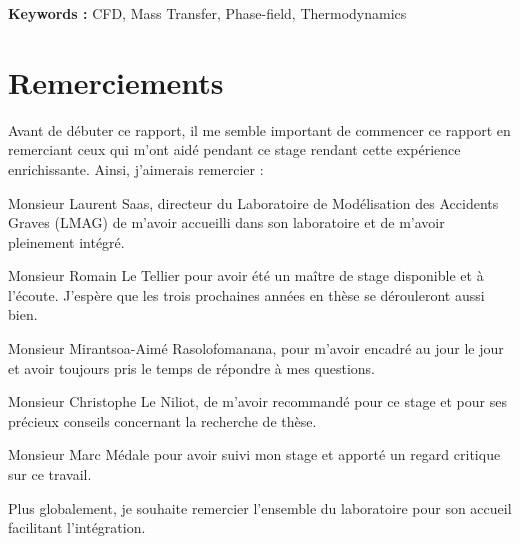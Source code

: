 \documentclass[a4paper,11pt]{report}    %
\begin{document}
\noindent\textbf{Keywords :} CFD, Mass Transfer, Phase-field, Thermodynamics


\newpage
\hypersetup{pageanchor=true}
\tableofcontents


\newpage




\newpage
%
\section*{Remerciements}
Avant de débuter ce rapport, il me semble important de commencer ce rapport en remerciant ceux qui m’ont aidé pendant ce stage rendant cette expérience enrichissante. Ainsi, j'aimerais remercier : 

Monsieur Laurent Saas, directeur du Laboratoire de Modélisation des Accidents Graves (LMAG) de m'avoir accueilli dans son laboratoire et de m'avoir pleinement intégré.

Monsieur Romain Le Tellier pour avoir été un maître de stage disponible et à l'écoute. J'espère que les trois prochaines années en thèse se dérouleront aussi bien.

Monsieur Mirantsoa-Aimé Rasolofomanana, pour m'avoir encadré au jour le jour et avoir toujours pris le temps de répondre à mes questions.

Monsieur Christophe Le Niliot, de m'avoir recommandé pour ce stage et pour ses précieux conseils concernant la recherche de thèse.

Monsieur Marc Médale pour avoir suivi mon stage et apporté un regard critique sur ce travail.

Plus globalement, je souhaite remercier l'ensemble du laboratoire pour son accueil facilitant l'intégration.

\setcounter{page}{1}









\newpage
\printbibliography
\appendix
%
%
%
\end{document}
